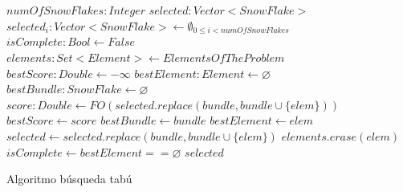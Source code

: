 \begin{algorithm}[H]
\begin{algorithmic}[1]
\REQUIRE $numOfSnowFlakes:Integer$
\ENSURE $selected:Vector<SnowFlake>$
\STATE $selected_{i}:Vector<SnowFlake> \leftarrow \emptyset_{0\leq i<numOfSnowFlakes}$
\STATE $isComplete:Bool \leftarrow False$
\STATE $elements:Set<Element> \leftarrow ElementsOfTheProblem$
  \STATE $bestScore:Double \leftarrow -\infty$
  \STATE $bestElement:Element \leftarrow \varnothing$
  \STATE $bestBundle:SnowFlake \leftarrow \varnothing$
        \STATE $score:Double \leftarrow FO(selected.replace(bundle, bundle \cup \{elem\}))$
          \STATE $bestScore \leftarrow score$
          \STATE $bestBundle \leftarrow bundle$
          \STATE $bestElement \leftarrow elem$
        \ENDIF
      \ENDIF
    \ENDFOR
  \ENDFOR
  \STATE $selected \leftarrow selected.replace(bundle, bundle \cup \{elem\})$
  \STATE $elements.erase(elem)$
  \STATE $isComplete \leftarrow bestElement == \varnothing$
\ENDWHILE
\RETURN $selected$
\end{algorithmic}
\caption{Algoritmo búsqueda tabú}\label{alg:algBusTabuIntra}
\end{algorithm}